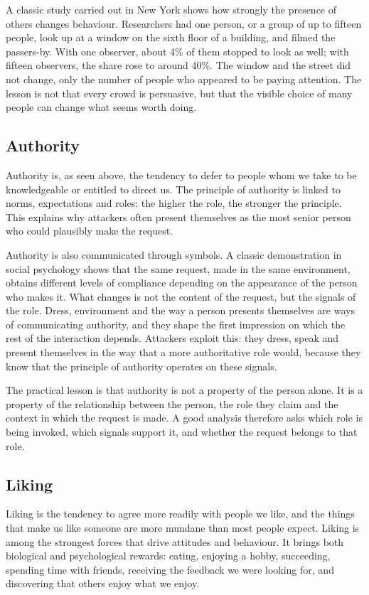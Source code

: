 A classic study carried out in New York shows how strongly the presence of others changes behaviour. Researchers had one person, or a group of up to fifteen people, look up at a window on the sixth floor of a building, and filmed the passers-by. With one observer, about 4\% of them stopped to look as well; with fifteen observers, the share rose to around 40\%. The window and the street did not change, only the number of people who appeared to be paying attention. The lesson is not that every crowd is persuasive, but that the visible choice of many people can change what seems worth doing.

\subsection{Authority}
Authority is, as seen above, the tendency to defer to people whom we take to be knowledgeable or entitled to direct us. The principle of authority is linked to norms, expectations and roles: the higher the role, the stronger the principle. This explains why attackers often present themselves as the most senior person who could plausibly make the request.

Authority is also communicated through symbols. A classic demonstration in social psychology shows that the same request, made in the same environment, obtains different levels of compliance depending on the appearance of the person who makes it. What changes is not the content of the request, but the signals of the role. Dress, environment and the way a person presents themselves are ways of communicating authority, and they shape the first impression on which the rest of the interaction depends. Attackers exploit this: they dress, speak and present themselves in the way that a more authoritative role would, because they know that the principle of authority operates on these signals.

The practical lesson is that authority is not a property of the person alone. It is a property of the relationship between the person, the role they claim and the context in which the request is made. A good analysis therefore asks which role is being invoked, which signals support it, and whether the request belongs to that role.

\subsection{Liking}
Liking is the tendency to agree more readily with people we like, and the things that make us like someone are more mundane than most people expect. Liking is among the strongest forces that drive attitudes and behaviour. It brings both biological and psychological rewards: eating, enjoying a hobby, succeeding, spending time with friends, receiving the feedback we were looking for, and discovering that others enjoy what we enjoy.

